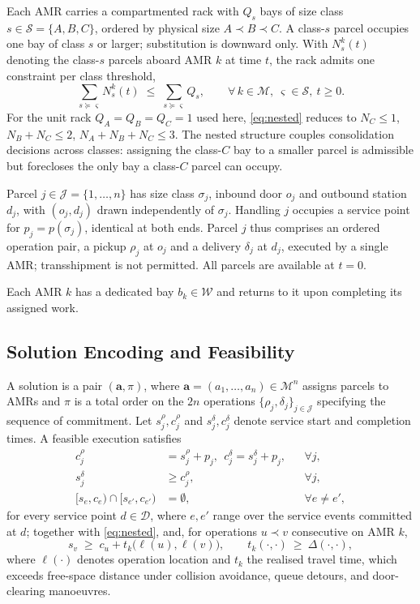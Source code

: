 Each AMR carries a compartmented rack with $Q_s$ bays of size class
$s\in\mathcal{S}=\{A,B,C\}$, ordered by physical size $A\prec B\prec C$. A
class-$s$ parcel occupies one bay of class $s$ or larger; substitution is
downward only. With $N^k_s(t)$ denoting the class-$s$ parcels aboard AMR $k$
at time $t$, the rack admits one constraint per class threshold,
\begin{equation}
\sum_{s \succeq \varsigma} N^k_s(t)
\;\le\;
\sum_{s \succeq \varsigma} Q_s,
\qquad \forall\, k\in\mathcal{M},\ \varsigma\in\mathcal{S},\ t\ge 0 .
\label{eq:nested}
\end{equation}
For the unit rack $Q_A=Q_B=Q_C=1$ used here, \eqref{eq:nested} reduces to
$N_C\le1$, $N_B+N_C\le2$, $N_A+N_B+N_C\le3$. The nested structure couples
consolidation decisions across classes: assigning the class-$C$ bay to a
smaller parcel is admissible but forecloses the only bay a class-$C$ parcel
can occupy.

Parcel $j\in\mathcal{J}=\{1,\dots,n\}$ has size class $\sigma_j$, inbound
door $o_j$ and outbound station $d_j$, with $(o_j,d_j)$ drawn independently
of $\sigma_j$. Handling $j$ occupies a service point for $p_j=p(\sigma_j)$,
identical at both ends. Parcel $j$ thus comprises an ordered operation pair,
a pickup $\rho_j$ at $o_j$ and a delivery $\delta_j$ at $d_j$, executed by a
single AMR; transshipment is not permitted. All parcels are available at
$t=0$.

Each AMR $k$ has a dedicated bay $b_k\in\mathcal{W}$ and returns to it upon
completing its assigned work.

\subsection{Solution Encoding and Feasibility}
\label{sec:formal}

A solution is a pair $(\bm{a},\pi)$, where
$\bm{a}=(a_1,\dots,a_n)\in\mathcal{M}^{n}$ assigns parcels to AMRs and $\pi$
is a total order on the $2n$ operations
$\{\rho_j,\delta_j\}_{j\in\mathcal{J}}$ specifying the sequence of
commitment. Let $s^{\rho}_j,c^{\rho}_j$ and $s^{\delta}_j,c^{\delta}_j$
denote service start and completion times. A feasible execution satisfies
\begin{align}
c^{\rho}_j &= s^{\rho}_j + p_j, \ \ c^{\delta}_j = s^{\delta}_j + p_j,
&& \forall j, \label{eq:nonpreempt}\\
s^{\delta}_j &\ge c^{\rho}_j, && \forall j, \label{eq:precedence}\\
[s_e,c_e) \cap [s_{e'},c_{e'}) &= \emptyset, && \forall e\ne e',
\label{eq:exclusive}
\end{align}
for every service point $d\in\mathcal{D}$, where $e,e'$ range over the
service events committed at $d$;
together with \eqref{eq:nested}, and, for operations $u\prec v$ consecutive
on AMR $k$,
\begin{equation}
s_v \;\ge\; c_u + t_k\big(\ell(u),\ell(v)\big),
\qquad t_k(\cdot,\cdot)\ \ge\ \Delta(\cdot,\cdot),
\label{eq:travel}
\end{equation}
where $\ell(\cdot)$ denotes operation location and $t_k$ the realised travel
time, which exceeds free-space distance under collision avoidance, queue
detours, and door-clearing manoeuvres.

